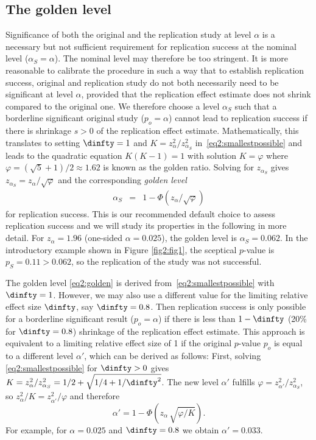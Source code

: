 \subsection{The golden level}\label{sec2:goldenthresh}
Significance of both the original and the replication study at level $\alpha$ is
a necessary but not sufficient requirement for replication success at the
nominal level ($\alpha_S = \alpha$). The nominal level may therefore be too
stringent. It is more reasonable to calibrate the procedure in such a way that
to establish replication success, original and replication study do not both
necessarily need to be significant at level $\alpha$, provided that the
replication effect estimate does not shrink compared to the original one. We
therefore choose a level $\alpha_S$ such that a borderline significant original
study ($p_o = \alpha$) cannot lead to replication success if there is shrinkage
$s > 0$ of the replication effect estimate. Mathematically, this translates to
setting $\dinfty = 1$ and $K = z_\alpha^2/z_{\alpha_S}^2$
in~\eqref{eq2:smallestpossible} and leads to the quadratic equation $K(K-1) = 1$
with solution $K = \varphi$ where $\varphi = (\sqrt{5}+1)/2 \approx 1.62$ is
known as the golden ratio. Solving for $z_{\alpha_S}$ gives
$z_{\alpha_S} = z_\alpha / \sqrt{\varphi}$ and the corresponding \textit{golden
  level}
\begin{eqnarray}\label{eq2:golden}
\alpha_S & = & 1 -  \Phi(z_\alpha / \sqrt{\varphi} )
\end{eqnarray}
for replication success. This is our recommended default choice to assess
replication success and we will study its properties in the following in more
detail. For $z_\alpha = 1.96$ (one-sided $\alpha = 0.025$), the golden level is
$\alpha_S =0.062$. In the introductory example shown in Figure \ref{fig2:fig1},
the sceptical $p$-value is $p_S=0.11 > 0.062$, so the replication of the
\citet{Pyc2010} study was not successful.




The golden level \eqref{eq2:golden} is derived from~\eqref{eq2:smallestpossible}
with $\dinfty = 1$. However, we may also use a different value for the limiting
relative effect size $\dinfty$, say $\dinfty=0.8$. Then replication success is
only possible for a borderline significant result ($p_o = \alpha$) if there is
less than $1-\dinfty$ (20\% for $\dinfty=0.8$) shrinkage of the replication
effect estimate. This approach is equivalent to a limiting relative effect size
of 1 if the original $p$-value $p_o$ is equal to a different level $\alpha'$,
which can be derived as follows: First, solving \eqref{eq2:smallestpossible} for
$\dinfty > 0$ gives
$K = z_\alpha^2/z_{\alpha_S}^2 = 1/2+\sqrt{1/4 + 1/\dinfty^2}$. The new level
$\alpha'$ fulfills $\varphi=z_{\alpha'}^2/z_{\alpha_S}^2$, so
$z_\alpha^2/K=z_{\alpha'}^2/\varphi$ and therefore
\begin{equation}\label{eq2:alphaPrime}
\alpha' = 1-\Phi\left(z_{\alpha} \, \sqrt{\varphi / K} \right).
\end{equation}
For example, for $\alpha = 0.025$ and $\dinfty = 0.8$ we obtain $\alpha'=0.033$.


